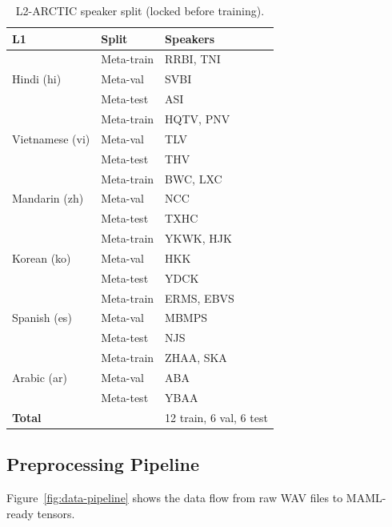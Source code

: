 \documentclass[12pt]{article}
\theoremstyle{plain}
\begin{document}
\begin{table}[H]
\centering
\caption{L2-ARCTIC speaker split (locked before training).}
\label{tab:split}
\begin{tabular}{llp{7.0cm}}
\toprule
\textbf{L1} & \textbf{Split} & \textbf{Speakers} \\
\midrule
\multirow{3}{*}{Hindi (hi)}
  & Meta-train & RRBI, TNI \\
  & Meta-val   & SVBI \\
  & Meta-test  & ASI \\
\midrule
\multirow{3}{*}{Vietnamese (vi)}
  & Meta-train & HQTV, PNV \\
  & Meta-val   & TLV \\
  & Meta-test  & THV \\
\midrule
\multirow{3}{*}{Mandarin (zh)}
  & Meta-train & BWC, LXC \\
  & Meta-val   & NCC \\
  & Meta-test  & TXHC \\
\midrule
\multirow{3}{*}{Korean (ko)}
  & Meta-train & YKWK, HJK \\
  & Meta-val   & HKK \\
  & Meta-test  & YDCK \\
\midrule
\multirow{3}{*}{Spanish (es)}
  & Meta-train & ERMS, EBVS \\
  & Meta-val   & MBMPS \\
  & Meta-test  & NJS \\
\midrule
\multirow{3}{*}{Arabic (ar)}
  & Meta-train & ZHAA, SKA \\
  & Meta-val   & ABA \\
  & Meta-test  & YBAA \\
\midrule
\textbf{Total} & & 12 train, 6 val, 6 test \\
\bottomrule
\end{tabular}
\end{table}

\subsection{Preprocessing Pipeline}

Figure~\ref{fig:data-pipeline} shows the data flow from raw WAV files to
MAML-ready tensors.
\end{document}
